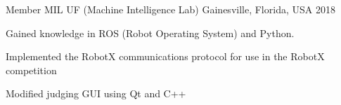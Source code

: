 

\begin{cventries}

  \cventry
    {Member} %
    {MIL UF (Machine Intelligence Lab)} %
    {Gainesville, Florida, USA} %
    {2018} %
    {
      \begin{cvitems} %
        \item {Gained knowledge in ROS (Robot Operating System) and Python.}
        \item {Implemented the RobotX communications protocol for use in the RobotX competition}
        \item {Modified judging GUI using Qt and C++}
      \end{cvitems}
    }

\end{cventries}
